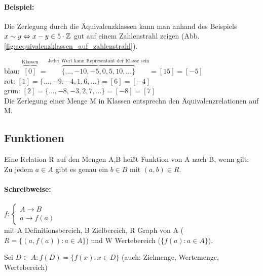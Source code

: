 \paragraph{Beispiel:} Die Zerlegung durch die Äquivalenzklassen kann man anhand des Beispiels $x\sim y \Leftrightarrow x-y\in 5\cdot \mathbb{Z}$ gut auf einem Zahlenstrahl zeigen (Abb. \ref{fig:aequivalenzklassen_auf_zahlenstrahl}).

\noindent blau: $\overbrace{[0]}^{\textrm{Klassen}}=\overbrace{\{...,-10,-5,0,5,10,...\}}^{\textrm{Jeder Wert kann Representant der Klasse sein}}=[15]=[-5]$\\
rot: $[1]=\{...,-9,-4,1,6,...\}=[6]=[-4]$\\
grün: $[2]=\{...,-8,-3,2,7,...\}=[-8]=[7]$\\ 

Die Zerlegung einer Menge M in Klassen entsprechn den Äquivalenzrelationen auf M.

\subsection{Funktionen}

\begin{defi}[Funktion]
Eine Relation R auf den Mengen A,B heißt Funktion von A nach B, wenn gilt: Zu jedem $a\in A$ gibt es genau ein $b\in B$ mit $(a,b)\in R$.
\end{defi}

\paragraph{Schreibweise:}
$f: 
\begin{cases} 
A \rightarrow B \\
a \rightarrow f(a)
\end{cases}$\\
mit A Definitionsbereich, B Zielbereich, R Graph von A ($R=\{(a,f(a)):a\in A\}$) und W Wertebereich ($\{f(a):a\in A\}$).

\begin{defi}
Sei $D\subset A: f(D)=\{f(x):x\in D\}$ (auch: Zielmenge, Wertemenge, Wertebereich)
\end{defi}

